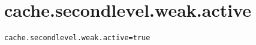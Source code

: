 \section{cache.secondlevel.weak.active}
\label{configuration:CacheSecondlevelWeakActive}
\AvailableInJavaAndCsharp{\TODO}
\begin{lstlisting}[style=Props,caption={Usage example for \textit{cache.secondlevel.weak.active}}]
cache.secondlevel.weak.active=true
\end{lstlisting}